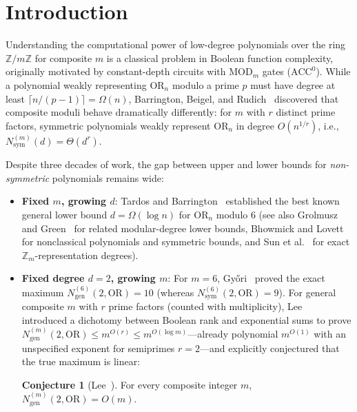 \documentclass[11pt,a4paper]{article}
\theoremstyle{definition}
\newtheorem{conjecture}[theorem]{Conjecture}
\newcommand{\Z}{\mathbb{Z}}
\newcommand{\OR}{\mathrm{OR}}
\newcommand{\MOD}{\mathrm{MOD}}
\newcommand{\Nsym}{N_{\mathrm{sym}}}
\newcommand{\Ngen}{N_{\mathrm{gen}}}
\begin{document}
\tableofcontents

\section{Introduction}
\label{sec:intro}

Understanding the computational power of low-degree polynomials over the ring $\Z/m\Z$ for composite $m$ is a classical problem in Boolean function complexity, originally motivated by constant-depth circuits with $\MOD_m$ gates ($\mathrm{ACC}^0$). While a polynomial weakly representing $\OR_n$ modulo a prime $p$ must have degree at least $\lceil n/(p-1) \rceil = \Omega(n)$, Barrington, Beigel, and Rudich~\cite{BBR94} discovered that composite moduli behave dramatically differently: for $m$ with $r$ distinct prime factors, symmetric polynomials weakly represent $\OR_n$ in degree $O(n^{1/r})$, i.e., $\Nsym^{(m)}(d) = \Theta(d^r)$.

Despite three decades of work, the gap between upper and lower bounds for \emph{non-symmetric} polynomials remains wide:
\begin{itemize}[leftmargin=*]
  \item \textbf{Fixed $m$, growing $d$}: Tardos and Barrington~\cite{TB98} established the best known general lower bound $d = \Omega(\log n)$ for $\OR_n$ modulo $6$ (see also Grolmusz~\cite{Gro95} and Green~\cite{Gre01} for related modular-degree lower bounds, Bhowmick and Lovett~\cite{BL15} for nonclassical polynomials and symmetric bounds, and Sun et al.~\cite{SSWWXZ20} for exact $\Z_m$-representation degrees).
  \item \textbf{Fixed degree $d = 2$, growing $m$}: For $m = 6$, Gy{\H{o}}ri~\cite{Gyo07} proved the exact maximum $\Ngen^{(6)}(2, \OR) = 10$ (whereas $\Nsym^{(6)}(2, \OR) = 9$). For general composite $m$ with $r$ prime factors (counted with multiplicity), Lee~\cite{Lee15} introduced a dichotomy between Boolean rank and exponential sums to prove $\Ngen^{(m)}(2, \OR) \le m^{O(r)} \le m^{O(\log m)}$---already polynomial $m^{O(1)}$ with an unspecified exponent for semiprimes $r=2$---and explicitly conjectured that the true maximum is linear:
  \begin{conjecture}[Lee~\cite{Lee15}]
  \label{conj:lee}
  For every composite integer $m$, $\Ngen^{(m)}(2, \OR) = O(m)$.
  \end{conjecture}
\end{itemize}
\end{document}

